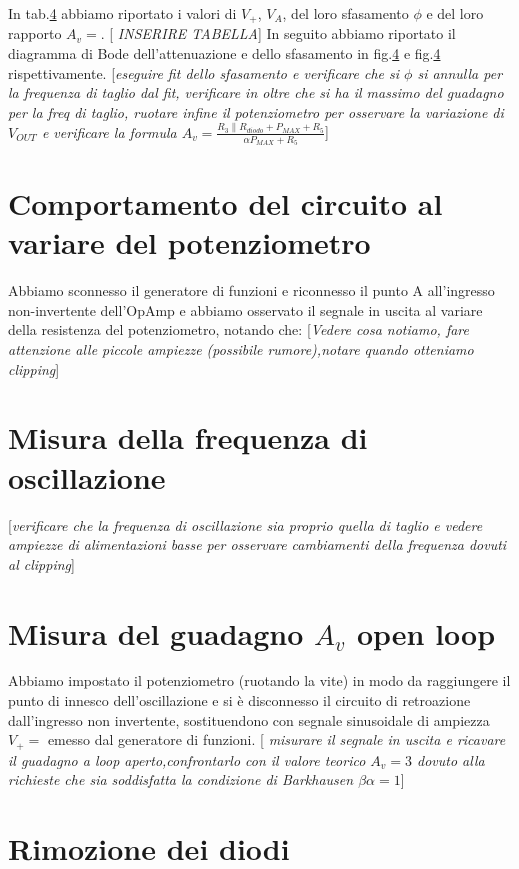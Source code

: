 \documentclass[10pt,a4paper]{article}
\newcommand{\rem}[1]{[\emph{#1}]}
\begin{document}
In tab.\ref{} abbiamo riportato i valori di $V_+$, $V_A$, del loro sfasamento $\phi$ e del loro rapporto $A_v=$. 
\rem{ INSERIRE TABELLA}
In seguito abbiamo riportato il diagramma di Bode dell'attenuazione e dello sfasamento in fig.\ref{} e fig.\ref{} rispettivamente.
\rem{eseguire fit dello sfasamento e verificare che si  $\phi$ si annulla per la frequenza di taglio dal fit, verificare in oltre che si ha il massimo del guadagno per la freq di taglio, ruotare infine il potenziometro per osservare la variazione di  $V_{OUT}$  e verificare la formula $A_v=\frac{R_3\parallel R_{diodo}+P_{MAX}+R_5}{\alpha P_{MAX}+R_5}$}


\section{Comportamento del circuito al variare del potenziometro}
Abbiamo sconnesso il generatore di funzioni e riconnesso il punto A all'ingresso non-invertente dell'OpAmp e abbiamo osservato il segnale in uscita al variare della resistenza del potenziometro, notando che:
\rem{Vedere cosa notiamo, fare attenzione alle piccole ampiezze (possibile rumore),notare quando otteniamo clipping}
\section{Misura della frequenza di oscillazione}
\rem{verificare che la frequenza di oscillazione sia proprio quella di taglio e vedere  ampiezze di alimentazioni basse per osservare  cambiamenti della frequenza dovuti al clipping}
\section{Misura del guadagno $A_v$ open loop}
Abbiamo impostato il potenziometro (ruotando la vite) in modo da raggiungere il punto di innesco dell’oscillazione e si è disconnesso il circuito di retroazione dall’ingresso non invertente, sostituendono con segnale sinusoidale di ampiezza  $V_+=$ emesso dal generatore di funzioni.
\rem{ misurare il segnale in uscita e ricavare il guadagno a loop aperto,confrontarlo con il valore teorico $A_v=3$ dovuto alla richieste che sia soddisfatta la condizione di Barkhausen $\beta \alpha =1$}
\section{Rimozione dei diodi}
\end{document}
